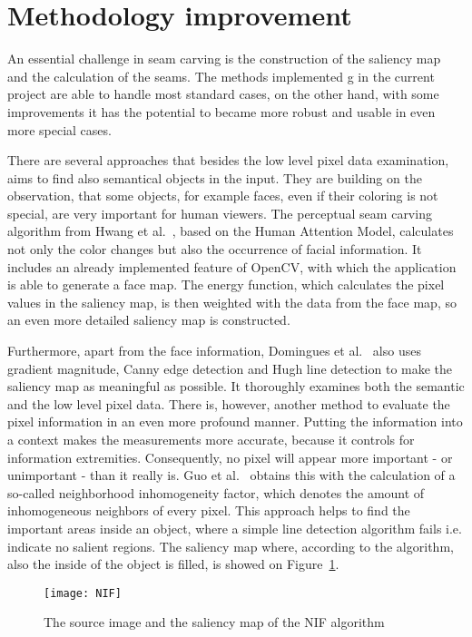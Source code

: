 \documentclass[draft,final]{vutinfth} %
\begin{document}
	\section{Methodology improvement}
	An essential challenge in seam carving is the construction of the saliency map and the calculation of the seams. 
	The methods implemented g in the current project are able to handle most standard cases, on the other hand, with some improvements it has the potential to became more robust and usable in even more special cases.\par 
	There are several approaches that besides the low level pixel data examination, aims to find also semantical objects in the input.
	They are building on the observation, that some objects, for example faces, even if their coloring is not special, are very important for human viewers.
	The perceptual seam carving algorithm from Hwang et al.~\cite{hwang2008content}, based on the Human Attention Model, calculates not only the color changes but also the occurrence of facial information.
	It includes an already implemented feature of OpenCV, with which the application is able to generate a face map.
	The energy function, which calculates the pixel values in the saliency map, is then weighted with the data from the face map, so an even more detailed saliency map is constructed.\par 
	Furthermore, apart from the face information, Domingues et al.~\cite{domingues2010stream} also uses gradient magnitude, Canny edge detection and Hugh line detection to make the saliency map as meaningful as possible. 
	It thoroughly examines both the semantic and the low level pixel data.
	There is, however, another method to evaluate the pixel information in an even more profound manner.
	Putting the information into a context makes the measurements more accurate, because it controls for information extremities.
	Consequently, no pixel will appear more important - or unimportant - than it really is.
	Guo et al.~\cite{guo2015nif} obtains this with the calculation of a so-called neighborhood inhomogeneity factor, which denotes the amount of inhomogeneous neighbors of every pixel. 
	This approach helps to find the important areas inside an object, where a simple line detection algorithm fails i.e. indicate no salient regions.
	The saliency map where, according to the algorithm, also the inside of the object is filled, is showed on Figure~\ref{fig:nif}.
	\begin{figure}[H]
		\centering		
		\texttt{[image: NIF]}
		\caption{The source image and the saliency map of the NIF algorithm ~\cite{guo2015nif} }
		\label{fig:nif}
	\end{figure}
\end{document}
